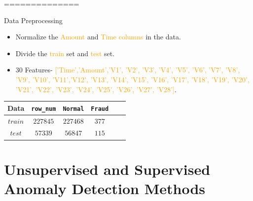 \documentclass[
 size=14pt,
 paper=smartboard,  %
 mode=present, 		%
 display=slides, 	%
 style=tuliplab,  	%
 pauseslide,
 fleqn,leqno]{powerdot}
\begin{document}
==============
\begin{slide}[toc=,bm=]{Data Preprocessing}
	\begin{itemize}
		\item
		Normalize the  \textcolor{orange} {Amount} and  \textcolor{orange} {Time columns} in the data.
	\end{itemize}
	\begin{itemize}
	\item
	Divide the  \textcolor{orange} {train} set and  \textcolor{orange} {test} set.
\end{itemize}
	\begin{itemize}
	\item
	30 Features- \textcolor{orange} {['Time','Amount','V1', 'V2', 'V3', 'V4', 'V5', 'V6', 'V7', 'V8', 'V9', 'V10', 'V11','V12', 'V13', 'V14', 'V15', 'V16', 'V17', 'V18', 'V19', 'V20', 'V21', 'V22', 'V23', 'V24', 'V25', 'V26', 'V27', 'V28']}.

\end{itemize}
\begin{center}
	\begin{tabular}{c| c c c c c }
	\toprule
	Data & \texttt{row_num}  & \texttt{Normal} & \texttt{Fraud} \\
	\midrule
	$train$
	&  {$227845$} &  {$227468$} &  {$377$} \\
	$test$
	&  {$57339$} &  {$56847$} &  {$115$} \\
	\bottomrule
\end{tabular}
\end{center}
\end{slide}






\section{Unsupervised and Supervised Anomaly Detection Methods}
\end{document}
